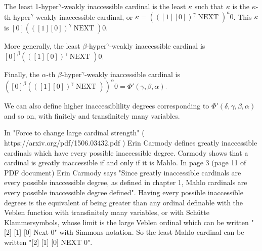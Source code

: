 \documentclass[10pt]{article}
\begin{document}
The least 1-hyper\(^\gamma\)-weakly inaccessible cardinal is the least \( \kappa \) such that \( \kappa \) is the \(\kappa\)-th hyper\(^\gamma\)-weakly inaccessible cardinal, or \( \kappa = (([1] [0])^\gamma \operatorname{NEXT})^\kappa 0 \). This \( \kappa \) is \( [0] (([1] [0])^\gamma \operatorname{NEXT}) 0 \).

More generally, the least \(\beta\)-hyper\(^\gamma\)-weakly inaccessible cardinal is \( [0]^\beta (([1] [0])^\gamma \operatorname{NEXT}) 0 \).

Finally, the \(\alpha\)-th \(\beta\)-hyper\(^\gamma\)-weakly inaccessible cardinal is \( ([0]^\beta (([1] [0])^\gamma \operatorname{NEXT}))^\alpha 0 = \Phi'(\gamma,\beta,\alpha) \).

We can also define higher inaccessiblility degrees corresponding to \( \Phi'(\delta,\gamma,\beta,\alpha) \) and so on, with finitely and transfinitely many variables.


\bigskip

In "Force to change large cardinal strength" ( https://arxiv.org/pdf/1506.03432.pdf ) Erin Carmody defines greatly inaccessible cardinals which have every possible inaccessible degree.
Carmody shows that a cardinal is greatly inaccessible if and only if it is Mahlo. 
In  page 3 (page 11 of PDF document) Erin Carmody says "Since greatly
inaccessible cardinals are every possible inaccessible degree, as defined in chapter 1, Mahlo
cardinals are every possible inaccessible degree defined".
Having every possible inaccessible degrees is the equivalent of being greater than any ordinal definable with the Veblen function with transfinitely many variables, or with Schütte Klammersymbols, whose limit is the large Veblen ordinal which can be written "[2] [1] [0] Next 0" with Simmons notation. 
So the least Mahlo cardinal can be written "[2] [1] [0] NEXT 0".

\begin{comment}
In  page 3 of "Force to change large cardinal strength" ( https://arxiv.org/pdf/1506.03432.pdf ) (page 11 of PDF document) Erin Carmody says "Since greatly
inaccessible cardinals are every possible inaccessible degree, as defined in chapter 1, Mahlo
cardinals are every possible inaccessible degree defined", every possible inaccessible degree being the equivalent of Veblen function with transfinitely many variables, or Schütte Klammersymbols, whose limit is the large Veblen ordinal, written [2] [1] [0] Next 0, so the least Mahlo cardinal can be written [2] [1] [0] NEXT 0.
\end{comment}
\end{document}
